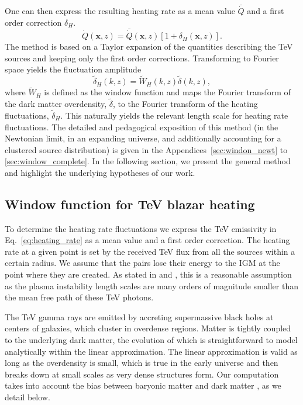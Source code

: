\documentclass[numberedappendix]{emulateapj}
\begin{document}
One can then express the resulting heating rate as a mean value $\bar{\dot{Q}}$ and a first order correction $\delta_H$.
\begin{equation}
\label{eq:delta_h}
\dot{Q}(\mathbf{x},z)=\bar{\dot{Q}}(\mathbf{x},z)\left[1+\delta_H(\mathbf{x},z)\right].
\end{equation}
The method is based on a Taylor expansion of the quantities describing the TeV sources and keeping only the first order corrections. Transforming to Fourier space yields the fluctuation amplitude
\begin{equation}
\label{eq:use_window}
\tilde{\delta}_H(k,z)=\tilde{W}_H(k,z)\tilde{\delta}(k,z),
\end{equation}
where $\tilde{W}_H$ is defined as the window function and maps the Fourier transform of the dark matter overdensity, $\tilde{\delta}$, to the Fourier transform of the heating fluctuations, $\tilde{\delta}_H$. This naturally yields the relevant length scale for heating rate fluctuations. The detailed and pedagogical exposition of this method (in the Newtonian limit, in an expanding universe, and additionally accounting for a clustered source distribution) is given in the Appendices~\ref{sec:windon_newt} to \ref{sec:window_complete}. In the following section, we present the general method and highlight the underlying hypotheses of our work.

\subsection{Window function for TeV blazar heating}\label{sec:window}
To determine the heating rate fluctuations we express the TeV emissivity in Eq.~\eqref{eq:heating_rate} as a mean value and a first order correction. The heating rate at a given point is set by the received TeV flux from all the sources within a certain radius. We assume that the pairs lose their energy to the IGM at the point where they are created. As stated in \citet{2012ApJ...752...22B} and \citet{2014ApJ...797..110C}, this is a reasonable assumption as the plasma instability length scales are many orders of magnitude smaller than the mean free path of these TeV photons.

The TeV gamma rays are emitted by accreting supermassive black holes at centers of galaxies, which cluster in overdense regions. Matter is tightly coupled to the underlying dark matter, the evolution of which is straightforward to model analytically within the linear approximation. The linear approximation is valid as long as the overdensity is small, which is true in the early universe and then breaks down at small scales as very dense structures form. Our computation takes into account the bias between baryonic matter and dark matter \citep{1996MNRAS.282..347M}, as we detail below.
\end{document}
